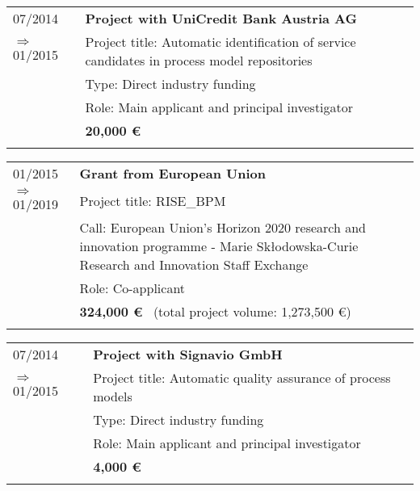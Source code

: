 \begin{tabular}{P{3cm}P{12cm}}		
07/2014															& \textbf{Project with UniCredit Bank Austria AG} \\
\hspace*{0.4cm} $\Rightarrow$ 01/2015 		& Project title: Automatic identification of service candidates in process model repositories	 \\
																		& Type: Direct industry funding \\
																		& Role: Main applicant and principal investigator \\\noalign{\smallskip}
																		& \textbf{20,000  \euro} \\
																		& \\
																		\end{tabular}														
\begin{tabular}{P{3cm}P{12cm}}		
01/2015															& \textbf{Grant from European Union} \\
\hspace*{0.4cm} $\Rightarrow$ 01/2019 		& Project title: RISE\_BPM  \\
																		& Call: European Union's Horizon 2020 research and innovation programme - Marie Skłodowska-Curie Research and Innovation Staff Exchange\\
																		& Role: Co-applicant \\\noalign{\smallskip}
																		& \textbf{324,000  \euro} \ (total project volume: 1,273,500 \euro) \\
																		& \\
																		\end{tabular}														
\begin{tabular}{P{3cm}P{12cm}}		
07/2014															& \textbf{Project with Signavio GmbH} \\
\hspace*{0.4cm} $\Rightarrow$ 01/2015 		& Project title: Automatic quality assurance of process models 	 \\
																		& Type: Direct industry funding \\
																		& Role: Main applicant and principal investigator \\\noalign{\smallskip}
																		& \textbf{4,000  \euro} \\
																		& \\
\end{tabular}														
